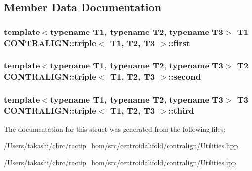 \subsection{Member Data Documentation}
\hypertarget{struct_c_o_n_t_r_a_l_i_g_n_1_1triple_a28cd5ceccab23ab8628d2c5e40147c44}{
\subsubsection[{first}]{\setlength{\rightskip}{0pt plus 5cm}template$<$typename T1, typename T2, typename T3$>$ T1 {\bf C\+O\+N\+T\+R\+A\+L\+I\+G\+N\+::triple}$<$ T1, T2, T3 $>$\+::first}}\label{struct_c_o_n_t_r_a_l_i_g_n_1_1triple_a28cd5ceccab23ab8628d2c5e40147c44}
\hypertarget{struct_c_o_n_t_r_a_l_i_g_n_1_1triple_a332bdb4bd1b4f90c53bec3c7e6bd41ff}{
\subsubsection[{second}]{\setlength{\rightskip}{0pt plus 5cm}template$<$typename T1, typename T2, typename T3$>$ T2 {\bf C\+O\+N\+T\+R\+A\+L\+I\+G\+N\+::triple}$<$ T1, T2, T3 $>$\+::second}}\label{struct_c_o_n_t_r_a_l_i_g_n_1_1triple_a332bdb4bd1b4f90c53bec3c7e6bd41ff}
\hypertarget{struct_c_o_n_t_r_a_l_i_g_n_1_1triple_a1ca35d32af351799a3b1132ad6f9ecfd}{
\subsubsection[{third}]{\setlength{\rightskip}{0pt plus 5cm}template$<$typename T1, typename T2, typename T3$>$ T3 {\bf C\+O\+N\+T\+R\+A\+L\+I\+G\+N\+::triple}$<$ T1, T2, T3 $>$\+::third}}\label{struct_c_o_n_t_r_a_l_i_g_n_1_1triple_a1ca35d32af351799a3b1132ad6f9ecfd}


The documentation for this struct was generated from the following files\+:\begin{DoxyCompactItemize}
\item 
/\+Users/takashi/cbrc/ractip\+\_\+hom/src/centroidalifold/contralign/\hyperlink{centroidalifold_2contralign_2_utilities_8hpp}{Utilities.\+hpp}\item 
/\+Users/takashi/cbrc/ractip\+\_\+hom/src/centroidalifold/contralign/\hyperlink{centroidalifold_2contralign_2_utilities_8ipp}{Utilities.\+ipp}\end{DoxyCompactItemize}
